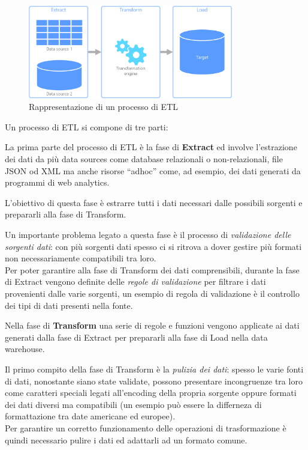 \documentclass[]{article}
\begin{document}
\begin{figure}
\centering
\includegraphics[width=0.80000\textwidth]{../images/etl.png}
\caption{Rappresentazione di un processo di ETL \label{figure_4}}
\end{figure}

Un processo di ETL si compone di tre parti:

La prima parte del processo di ETL è la fase di \textbf{Extract} ed
involve l'estrazione dei dati da più data sources come database
relazionali o non-relazionali, file JSON od XML ma anche risorse
``adhoc'' come, ad esempio, dei dati generati da programmi di web
analytics.

L'obiettivo di questa fase è estrarre tutti i dati necessari dalle
possibili sorgenti e prepararli alla fase di Transform.

Un importante problema legato a questa fase è il processo di
\emph{validazione delle sorgenti dati}: con più sorgenti dati spesso ci
si ritrova a dover gestire più formati non necessariamente compatibili
tra loro.\\
Per poter garantire alla fase di Transform dei dati comprensibili,
durante la fase di Extract vengono definite delle \emph{regole di
validazione} per filtrare i dati provenienti dalle varie sorgenti, un
esempio di regola di validazione è il controllo dei tipi di dati
presenti nella fonte.

\newpage

Nella fase di \textbf{Transform} una serie di regole e funzioni vengono
applicate ai dati generati dalla fase di Extract per prepararli alla
fase di Load nella data warehouse.

Il primo compito della fase di Transform è la \emph{pulizia dei dati}:
spesso le varie fonti di dati, nonostante siano state validate, possono
presentare incongruenze tra loro come caratteri speciali legati
all'encoding della propria sorgente oppure formati dei dati diversi ma
compatibili (un esempio può essere la differneza di formattazione tra
date americane ed europee).\\
Per garantire un corretto funzionamento delle operazioni di
trasformazione è quindi necessario pulire i dati ed adattarli ad un
formato comune.
\end{document}
